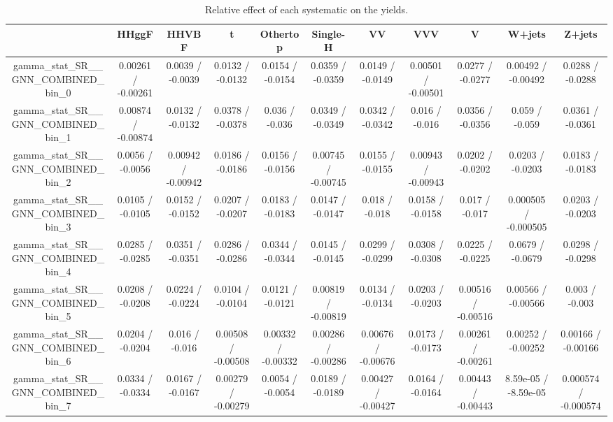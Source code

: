 \documentclass[10pt]{article}
\begin{document}
\begin{table}[htbp]
\begin{center}
\begin{tabular}{|c|c|c|c|c|c|c|c|c|c|c|}
\hline 
      & HHggF      & HHVBF      & t      & Othertop      & Single-H      & VV      & VVV      & V      & W+jets      & Z+jets \\ 
\hline 
  gamma_stat_SR__GNN_COMBINED_bin_0 & 0.00261 / -0.00261 & 0.0039 / -0.0039 & 0.0132 / -0.0132 & 0.0154 / -0.0154 & 0.0359 / -0.0359 & 0.0149 / -0.0149 & 0.00501 / -0.00501 & 0.0277 / -0.0277 & 0.00492 / -0.00492 & 0.0288 / -0.0288 \\ 
  gamma_stat_SR__GNN_COMBINED_bin_1 & 0.00874 / -0.00874 & 0.0132 / -0.0132 & 0.0378 / -0.0378 & 0.036 / -0.036 & 0.0349 / -0.0349 & 0.0342 / -0.0342 & 0.016 / -0.016 & 0.0356 / -0.0356 & 0.059 / -0.059 & 0.0361 / -0.0361 \\ 
  gamma_stat_SR__GNN_COMBINED_bin_2 & 0.0056 / -0.0056 & 0.00942 / -0.00942 & 0.0186 / -0.0186 & 0.0156 / -0.0156 & 0.00745 / -0.00745 & 0.0155 / -0.0155 & 0.00943 / -0.00943 & 0.0202 / -0.0202 & 0.0203 / -0.0203 & 0.0183 / -0.0183 \\ 
  gamma_stat_SR__GNN_COMBINED_bin_3 & 0.0105 / -0.0105 & 0.0152 / -0.0152 & 0.0207 / -0.0207 & 0.0183 / -0.0183 & 0.0147 / -0.0147 & 0.018 / -0.018 & 0.0158 / -0.0158 & 0.017 / -0.017 & 0.000505 / -0.000505 & 0.0203 / -0.0203 \\ 
  gamma_stat_SR__GNN_COMBINED_bin_4 & 0.0285 / -0.0285 & 0.0351 / -0.0351 & 0.0286 / -0.0286 & 0.0344 / -0.0344 & 0.0145 / -0.0145 & 0.0299 / -0.0299 & 0.0308 / -0.0308 & 0.0225 / -0.0225 & 0.0679 / -0.0679 & 0.0298 / -0.0298 \\ 
  gamma_stat_SR__GNN_COMBINED_bin_5 & 0.0208 / -0.0208 & 0.0224 / -0.0224 & 0.0104 / -0.0104 & 0.0121 / -0.0121 & 0.00819 / -0.00819 & 0.0134 / -0.0134 & 0.0203 / -0.0203 & 0.00516 / -0.00516 & 0.00566 / -0.00566 & 0.003 / -0.003 \\ 
  gamma_stat_SR__GNN_COMBINED_bin_6 & 0.0204 / -0.0204 & 0.016 / -0.016 & 0.00508 / -0.00508 & 0.00332 / -0.00332 & 0.00286 / -0.00286 & 0.00676 / -0.00676 & 0.0173 / -0.0173 & 0.00261 / -0.00261 & 0.00252 / -0.00252 & 0.00166 / -0.00166 \\ 
  gamma_stat_SR__GNN_COMBINED_bin_7 & 0.0334 / -0.0334 & 0.0167 / -0.0167 & 0.00279 / -0.00279 & 0.0054 / -0.0054 & 0.0189 / -0.0189 & 0.00427 / -0.00427 & 0.0164 / -0.0164 & 0.00443 / -0.00443 & 8.59e-05 / -8.59e-05 & 0.000574 / -0.000574 \\ 
\hline 
\end{tabular} 
\caption{Relative effect of each systematic on the yields.} 
\end{center} 
\end{table} 
\end{document}
